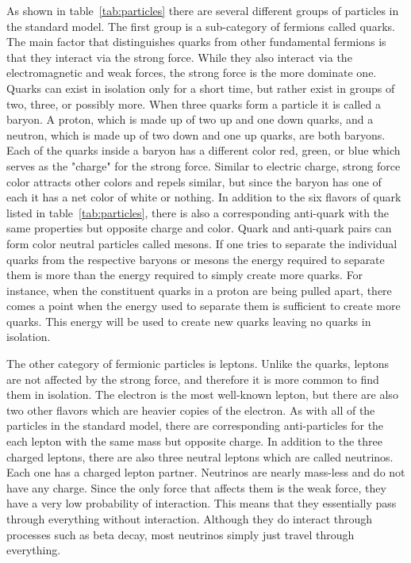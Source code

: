 As shown in table~\ref{tab:particles} there are several different groups of particles in the standard model. The first group is a sub-category of fermions called quarks. The main factor that distinguishes quarks from other fundamental fermions is that they interact via the strong force. While they also interact via the electromagnetic and weak forces, the strong force is the more dominate one. Quarks can exist in isolation only for a short time, but rather exist in groups of two, three, or possibly more. When three quarks form a particle it is called a baryon. A proton, which is made up of two up and one down quarks, and a neutron, which is made up of two down and one up quarks, are both baryons. Each of the quarks inside a baryon has a different color red, green, or blue which serves as the "charge" for the strong force. Similar to electric charge, strong force color attracts other colors and repels similar, but since the baryon has one of each it has a net color of white or nothing. In addition to the six flavors of quark listed in table~\ref{tab:particles}, there is also a corresponding anti-quark with the same properties but opposite charge and color. Quark and anti-quark pairs can form color neutral particles called mesons. If one tries to separate the individual quarks from the respective baryons or mesons the energy required to separate them is more than the energy required to simply create more quarks. For instance, when the constituent quarks in a proton are being pulled apart, there comes a point when the energy used to separate them is sufficient to create more quarks. This energy will be used to create new quarks leaving no quarks in isolation.

The other category of fermionic particles is leptons. Unlike the quarks, leptons are not affected by the strong force, and therefore it is more common to find them in isolation. The electron is the most well-known lepton, but there are also two other flavors which are heavier copies of the electron. As with all of the particles in the standard model, there are corresponding anti-particles for the each lepton with the same mass but opposite charge. In addition to the three charged leptons, there are also three neutral leptons which are called neutrinos. Each one has a charged lepton partner. Neutrinos are nearly mass-less and do not have any charge. Since the only force that affects them is the weak force, they have a very low probability of interaction. This means that they essentially pass through everything without interaction. Although they do interact through processes such as beta decay, most neutrinos simply just travel through everything. 


